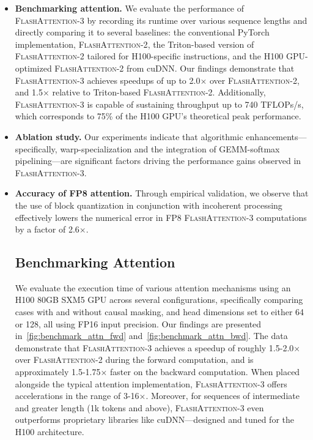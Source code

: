\begin{itemize}

\item \textbf{Benchmarking attention.} We evaluate the performance of \textsc{FlashAttention-3} by recording its runtime over various sequence lengths and directly comparing it to several baselines: the conventional PyTorch implementation, \textsc{FlashAttention-2}, the Triton-based version of \textsc{FlashAttention-2} tailored for H100-specific instructions, and the H100 GPU-optimized \textsc{FlashAttention-2} from cuDNN. Our findings demonstrate that \textsc{FlashAttention-3} achieves speedups of up to 2.0$\times$ over \textsc{FlashAttention-2}, and 1.5$\times$ relative to Triton-based \textsc{FlashAttention-2}. Additionally, \textsc{FlashAttention-3} is capable of sustaining throughput up to 740 TFLOPs/s, which corresponds to 75\% of the H100 GPU’s theoretical peak performance.

\item \textbf{Ablation study.} Our experiments indicate that algorithmic enhancements—specifically, warp-specialization and the integration of GEMM-softmax pipelining—are significant factors driving the performance gains observed in \textsc{FlashAttention-3}.

\item \textbf{Accuracy of FP8 attention.} Through empirical validation, we observe that the use of block quantization in conjunction with incoherent processing effectively lowers the numerical error in FP8 \textsc{FlashAttention-3} computations by a factor of 2.6$\times$.

\subsection{Benchmarking Attention}
\label{subsec:benchmark_attn}

We evaluate the execution time of various attention mechanisms using an H100 80GB SXM5 GPU across several configurations, specifically comparing cases with and without causal masking, and head dimensions set to either 64 or 128, all using FP16 input precision. Our findings are presented in~\cref{fig:benchmark_attn_fwd} and~\cref{fig:benchmark_attn_bwd}. The data demonstrate that \textsc{FlashAttention-3} achieves a speedup of roughly 1.5-2.0$\times$ over \textsc{FlashAttention-2} during the forward computation, and is approximately 1.5-1.75$\times$ faster on the backward computation. When placed alongside the typical attention implementation, \textsc{FlashAttention-3} offers accelerations in the range of 3-16$\times$. Moreover, for sequences of intermediate and greater length (1k tokens and above), \textsc{FlashAttention-3} even outperforms proprietary libraries like cuDNN—designed and tuned for the H100 architecture.


\end{itemize}
